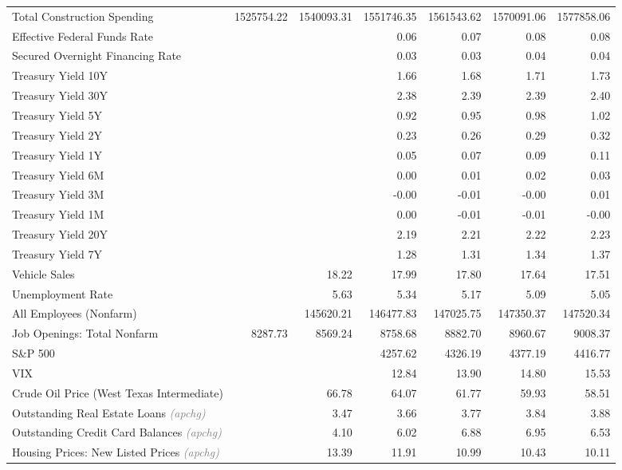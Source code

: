 \documentclass[11pt, letterpaper]{article}\usepackage[]{graphicx}\usepackage[]{color}
\begin{document}
\begin{table}[H]
\begin{tabular}{lrrrrrr}
  Total Construction Spending & 1525754.22 & 1540093.31 & 1551746.35 & 1561543.62 & 1570091.06 & 1577858.06 \\ 
  Effective Federal Funds Rate &  &  & 0.06 & 0.07 & 0.08 & 0.08 \\ 
  Secured Overnight Financing Rate &  &  & 0.03 & 0.03 & 0.04 & 0.04 \\ 
  Treasury Yield 10Y &  &  & 1.66 & 1.68 & 1.71 & 1.73 \\ 
  Treasury Yield 30Y &  &  & 2.38 & 2.39 & 2.39 & 2.40 \\ 
  Treasury Yield 5Y &  &  & 0.92 & 0.95 & 0.98 & 1.02 \\ 
  Treasury Yield 2Y &  &  & 0.23 & 0.26 & 0.29 & 0.32 \\ 
  Treasury Yield 1Y &  &  & 0.05 & 0.07 & 0.09 & 0.11 \\ 
  Treasury Yield 6M &  &  & 0.00 & 0.01 & 0.02 & 0.03 \\ 
  Treasury Yield 3M &  &  & -0.00 & -0.01 & -0.00 & 0.01 \\ 
  Treasury Yield 1M &  &  & 0.00 & -0.01 & -0.01 & -0.00 \\ 
  Treasury Yield 20Y &  &  & 2.19 & 2.21 & 2.22 & 2.23 \\ 
  Treasury Yield 7Y &  &  & 1.28 & 1.31 & 1.34 & 1.37 \\ 
  Vehicle Sales &  & 18.22 & 17.99 & 17.80 & 17.64 & 17.51 \\ 
  Unemployment Rate &  & 5.63 & 5.34 & 5.17 & 5.09 & 5.05 \\ 
  All Employees (Nonfarm) &  & 145620.21 & 146477.83 & 147025.75 & 147350.37 & 147520.34 \\ 
  Job Openings: Total Nonfarm & 8287.73 & 8569.24 & 8758.68 & 8882.70 & 8960.67 & 9008.37 \\ 
  S\&P 500 &  &  & 4257.62 & 4326.19 & 4377.19 & 4416.77 \\ 
  VIX &  &  & 12.84 & 13.90 & 14.80 & 15.53 \\ 
  Crude Oil Price (West Texas Intermediate) &  & 66.78 & 64.07 & 61.77 & 59.93 & 58.51 \\ 
  Outstanding Real Estate Loans \textit{\footnotesize\textcolor{gray}{(apchg)}} &  & 3.47 & 3.66 & 3.77 & 3.84 & 3.88 \\ 
  Outstanding Credit Card Balances \textit{\footnotesize\textcolor{gray}{(apchg)}} &  & 4.10 & 6.02 & 6.88 & 6.95 & 6.53 \\ 
  Housing Prices: New Listed Prices \textit{\footnotesize\textcolor{gray}{(apchg)}} &  & 13.39 & 11.91 & 10.99 & 10.43 & 10.11 \\ 

\end{tabular}
\end{table}
\end{document}
